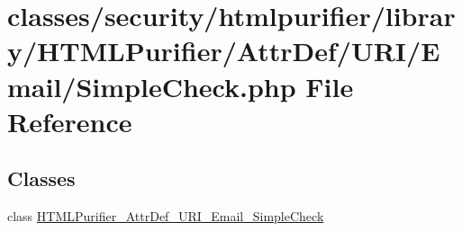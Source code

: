 \hypertarget{SimpleCheck_8php}{\section{classes/security/htmlpurifier/library/\+H\+T\+M\+L\+Purifier/\+Attr\+Def/\+U\+R\+I/\+Email/\+Simple\+Check.php File Reference}
\label{SimpleCheck_8php}
}
\subsection*{Classes}
\begin{DoxyCompactItemize}
\item 
class \hyperlink{classHTMLPurifier__AttrDef__URI__Email__SimpleCheck}{H\+T\+M\+L\+Purifier\+\_\+\+Attr\+Def\+\_\+\+U\+R\+I\+\_\+\+Email\+\_\+\+Simple\+Check}
\end{DoxyCompactItemize}

